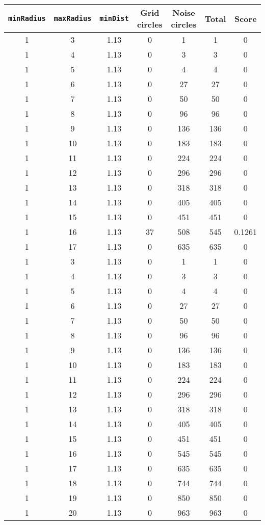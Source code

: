 \documentclass[letterpaper, 12pt]{article}
\begin{document}
\begin{longtable}{|c|c|c|c|c|c|c|}
\hline
\textbf{\texttt{minRadius}} & \textbf{\texttt{maxRadius}} & \textbf{\texttt{minDist}} & \textbf{Grid circles} & \textbf{Noise circles} & \textbf{Total} & \textbf{Score} \\
\hline
1 & 3 & 1.13 & 0 & 1 & 1 & 0 \\
\hline
1 & 4 & 1.13 & 0 & 3 & 3 & 0 \\
\hline
1 & 5 & 1.13 & 0 & 4 & 4 & 0 \\
\hline
1 & 6 & 1.13 & 0 & 27 & 27 & 0 \\
\hline
1 & 7 & 1.13 & 0 & 50 & 50 & 0 \\
\hline
1 & 8 & 1.13 & 0 & 96 & 96 & 0 \\
\hline
1 & 9 & 1.13 & 0 & 136 & 136 & 0 \\
\hline
1 & 10 & 1.13 & 0 & 183 & 183 & 0 \\
\hline
1 & 11 & 1.13 & 0 & 224 & 224 & 0 \\
\hline
1 & 12 & 1.13 & 0 & 296 & 296 & 0 \\
\hline
1 & 13 & 1.13 & 0 & 318 & 318 & 0 \\
\hline
1 & 14 & 1.13 & 0 & 405 & 405 & 0 \\
\hline
1 & 15 & 1.13 & 0 & 451 & 451 & 0 \\
\hline
1 & 16 & 1.13 & 37 & 508 & 545 & 0.1261 \\
\hline
1 & 17 & 1.13 & 0 & 635 & 635 & 0 \\
\hline
1 & 3 & 1.13 & 0 & 1 & 1 & 0 \\
\hline
1 & 4 & 1.13 & 0 & 3 & 3 & 0 \\
\hline
1 & 5 & 1.13 & 0 & 4 & 4 & 0 \\
\hline
1 & 6 & 1.13 & 0 & 27 & 27 & 0 \\
\hline
1 & 7 & 1.13 & 0 & 50 & 50 & 0 \\
\hline
1 & 8 & 1.13 & 0 & 96 & 96 & 0 \\
\hline
1 & 9 & 1.13 & 0 & 136 & 136 & 0 \\
\hline
1 & 10 & 1.13 & 0 & 183 & 183 & 0 \\
\hline
1 & 11 & 1.13 & 0 & 224 & 224 & 0 \\
\hline
1 & 12 & 1.13 & 0 & 296 & 296 & 0 \\
\hline
1 & 13 & 1.13 & 0 & 318 & 318 & 0 \\
\hline
1 & 14 & 1.13 & 0 & 405 & 405 & 0 \\
\hline
1 & 15 & 1.13 & 0 & 451 & 451 & 0 \\
\hline
1 & 16 & 1.13 & 0 & 545 & 545 & 0 \\
\hline
1 & 17 & 1.13 & 0 & 635 & 635 & 0 \\
\hline
1 & 18 & 1.13 & 0 & 744 & 744 & 0 \\
\hline
1 & 19 & 1.13 & 0 & 850 & 850 & 0 \\
\hline
1 & 20 & 1.13 & 0 & 963 & 963 & 0 \\
\hline
\end{longtable}
\end{document}
